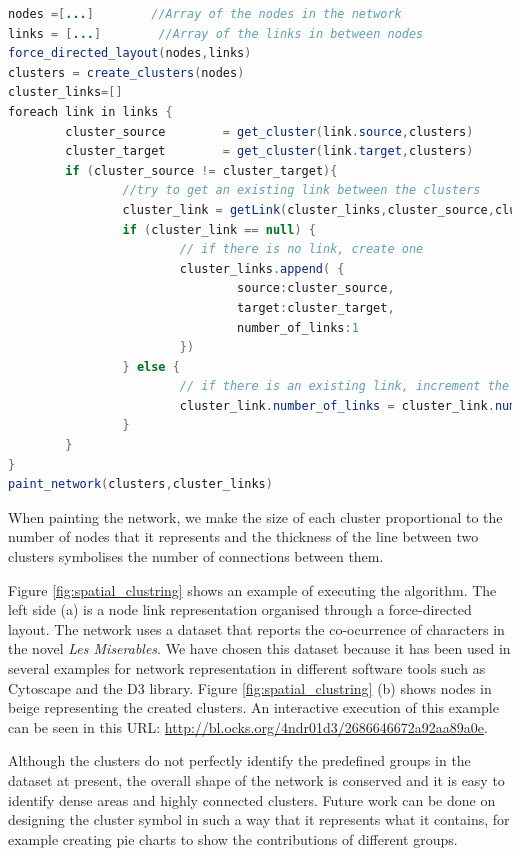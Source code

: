 \begin{lstlisting}[language=java]%,float,floatplacement=H]
nodes =[...]        //Array of the nodes in the network
links = [...]        //Array of the links in between nodes
force_directed_layout(nodes,links) 
clusters = create_clusters(nodes)
cluster_links=[]
foreach link in links {
        cluster_source        = get_cluster(link.source,clusters)
        cluster_target        = get_cluster(link.target,clusters)
        if (cluster_source != cluster_target){
                //try to get an existing link between the clusters
                cluster_link = getLink(cluster_links,cluster_source,cluster_target) 
                if (cluster_link == null) {
                        // if there is no link, create one
                        cluster_links.append( {
                                source:cluster_source, 
                                target:cluster_target, 
                                number_of_links:1
                        })
                } else {
                        // if there is an existing link, increment the number of links between the clusters
                        cluster_link.number_of_links = cluster_link.number_of_links +1
                }
        }
}
paint_network(clusters,cluster_links)
\end{lstlisting}

When painting the network, we make the size of each cluster proportional to the number of nodes that it represents and the thickness of the line between two clusters symbolises the number of connections between them.


Figure \ref{fig:spatial_clustring} shows an example of executing the algorithm. The left side (a) is a node link representation organised through a force-directed layout. The network uses a dataset that reports the co-ocurrence of characters in the novel \emph{Les Miserables}. We have chosen this dataset because it has been used in several examples for network representation in different software tools such as Cytoscape and the D3 library. Figure \ref{fig:spatial_clustring} (b) shows nodes in beige representing the created clusters. An interactive execution of this example can be seen in this URL: \url{http://bl.ocks.org/4ndr01d3/2686646672a92aa89a0e}. 

Although the clusters do not perfectly identify the predefined groups in the dataset at present, the overall shape of the network is conserved and it is easy to identify dense areas and highly connected clusters. Future work can be done on designing the cluster symbol in such a way that it represents what it contains, for example creating pie charts to show the contributions of different groups.

